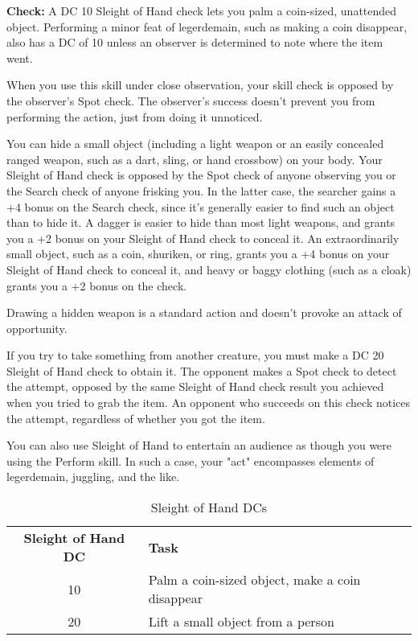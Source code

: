 \label{skill:Sleight Of Hand}

\textbf{Check:} A DC 10 Sleight of Hand check lets you palm a coin-sized, unattended 
object. Performing a minor feat of legerdemain, such as making a coin disappear, 
also has a DC of 10 unless an observer is determined to note where the item went.

When you use this skill under close observation, your skill check is opposed by 
the observer's Spot check. The observer's success doesn't prevent you from performing 
the action, just from doing it unnoticed.

You can hide a small object (including a light weapon or an easily concealed ranged 
weapon, such as a dart, sling, or hand crossbow) on your body. Your Sleight of 
Hand check is opposed by the Spot check of anyone observing you or the Search check 
of anyone frisking you. In the latter case, the searcher gains a +4 bonus on the 
Search check, since it's generally easier to find such an object than to hide it. 
A dagger is easier to hide than most light weapons, and grants you a +2 bonus on 
your Sleight of Hand check to conceal it. An extraordinarily small object, such 
as a coin, shuriken, or ring, grants you a +4 bonus on your Sleight of Hand check 
to conceal it, and heavy or baggy clothing (such as a cloak) grants you a +2 bonus 
on the check.

Drawing a hidden weapon is a standard action and doesn't provoke an attack of opportunity.

If you try to take something from another creature, you must make a DC 20 Sleight 
of Hand check to obtain it. The opponent makes a Spot check to detect the attempt, 
opposed by the same Sleight of Hand check result you achieved when you tried to 
grab the item. An opponent who succeeds on this check notices the attempt, regardless 
of whether you got the item.

You can also use Sleight of Hand to entertain an audience as though you were using 
the Perform skill. In such a case, your "act" encompasses elements of legerdemain, 
juggling, and the like.

\begin{table}[htb]
\caption{Sleight of Hand DCs}
\centering
\begin{tabular}{c l}
\textbf{Sleight of Hand DC} & \textbf{Task}\\
10 & Palm a coin-sized object, make a coin disappear\\
20 & Lift a small object from a person\\
\end{tabular}
\end{table}


